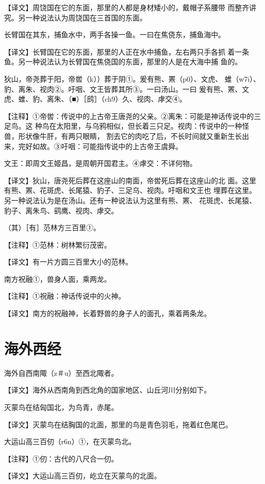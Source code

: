\documentclass[a4paper,12pt,UTF8,twoside]{ctexbook}
\begin{document}
【译文】周饶国在它的东面，那里的人都是身材矮小的，戴帽子系腰带 而整齐讲究。另一种说法认为周饶国在三首国的东面。

长臂国在其东，捕鱼水中，两手各操一鱼。一曰在焦侥东，捕鱼海中。

【译文】长臂国在它的东面，那里的人正在水中捕鱼，左右两只手各抓 着一条鱼。另一种说法认为长臂国在焦侥国的东面，那里的人是在大海中捕 鱼的。

狄山，帝尧葬于阳，帝喾（k））葬于阴①。爰有熊、罴（p0）、文虎、 蜼（w7i）、豹、离朱、视肉②。吁咽、文王皆葬其所③。一曰汤山。一曰 爰有熊、罴、文虎、蜼、豹、离朱、（■）［鸱］（ch9）久、视肉、虖交④。

【注释】①帝喾：传说中的上古帝王唐尧的父亲。②离朱：可能是神话传说中的三足鸟。这 种鸟在太阳里，与乌鸦相似，但长着三只足。视肉：传说中的一种怪兽，形状像牛肝，有两只眼睛， 割去它的肉吃了后，不长时间就又重新生长出来，完好如故。③吁咽：可能指传说中的上古帝王虞舜。

文王：即周文王姬昌，是周朝开国君主。④虖交：不详何物。

【译文】狄山，唐尧死后葬在这座山的南面，帝喾死后葬在这座山的北 面。这里有熊、罴、花斑虎、长尾猿、豹子、三足乌、视肉。吁咽和文王也 埋葬在这里。另一种说法认为是在汤山。还有一种说法认为这里有熊、罴、 花斑虎、长尾猿、豹子、离朱鸟、鹞鹰、视肉、虖交。

（其）［有］范林方三百里①。

【注释】①范林：树林繁衍茂密。

【译文】有一片方圆三百里大小的范林。

南方祝融①，兽身人面，乘两龙。

【注释】①祝融：神话传说中的火神。

【译文】南方的祝融神，长着野兽的身子人的面孔，乘着两条龙。

\chapter{海外西经}

海外自西南陬（z＃u）至西北陬者。

【译文】海外从西南角到西北角的国家地区、山丘河川分别如下。

灭蒙鸟在结匈国北，为鸟青，赤尾。

【译文】灭蒙鸟在结胸国的北面，那里的鸟是青色羽毛，拖着红色尾巴。

大运山高三百仞（r6n）①，在灭蒙鸟北。

【注释】①仞：古代的八尺合一仞。

【译文】大运山高三百仞，屹立在灭蒙鸟的北面。
\end{document}

